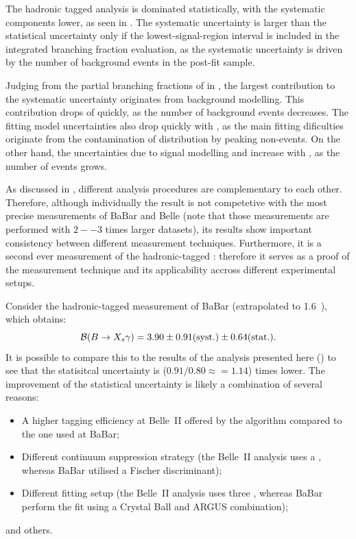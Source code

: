 The hadronic tagged \BtoXsgamma analysis is dominated statistically, with the systematic components lower, as seen in .
The systematic uncertainty is larger than the statistical uncertainty only if the lowest-\EB signal-region interval is included in the integrated branching fraction evaluation, 
as the systematic uncertainty is driven by the number of background events in the post-fit sample.

Judging from the partial branching fractions of \BtoXsgamma in ,
the largest contribution to the systematic uncertainty originates from background modelling.
This contribution drops of quickly, as the number of background events decreases.
The \Mbc fitting model uncertainties also drop quickly with \EB, as the main fitting dificulties originate from the contamination of \Mbc distribution by peaking non-\BtoXsgamma events.
On the other hand, the uncertainties due to signal modelling and \BtoXdgamma increase with \EB, as the number of \BtoXsdgamma events grows.

As discussed in , different analysis procedures are complementary to each other.
Therefore, although individually the result is not competetive with the most precise measurements of BaBar and Belle (note that those measurements are performed with $2--3$ times larger datasets),
its results show important consistency between different measurement techniques.
Furthermore, it is a second ever measurement of the hadronic-tagged \BtoXsgamma: therefore it serves as a proof of the measurement technique and its applicability accross different experimental setups.

Consider the hadronic-tagged measurement of BaBar \cite{BaBar:2007yhb} (extrapolated to 1.6~\gev), which obtains:
\begin{equation}\label{eq:babar_measurement}
    \mathcal{B}(\BtoXsgamma) = 3.90 \pm 0.91 \mathrm{(syst.)} \pm 0.64 \mathrm{(stat.)}.
\end{equation}
It is possible to compare this to the results of the analysis presented here ()
to see that the statisitcal uncertainty is ($0.91/0.80\approx=1.14$) times lower.
The improvement of the statistical uncertainty is likely a combination of several reasons:
\begin{itemize}
    \item A higher tagging efficiency at Belle~II offered by the \FEI algorithm compared to the one used at BaBar;
    \item Different continuum suppression strategy (the Belle~II analysis uses a \BDT, whereas BaBar utilised a Fischer discriminant);
    \item Different fitting setup (the Belle~II analysis uses three , whereas BaBar perform the fit using a Crystal Ball and ARGUS \PDF combination);
\end{itemize}
and others.


